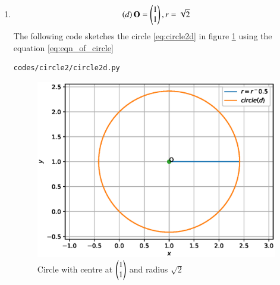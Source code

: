 \begin{enumerate}[label=\thesection.\arabic*.,ref=\thesection.\theenumi]
\item
\begin{align}
\left(d\right)\mathbf{O}=\begin{pmatrix}1\\1\end{pmatrix}, r=\sqrt{2}
\label{eq:circle2d}
\end{align}
The following code sketches the circle \ref{eq:circle2d} in figure \ref{fig:circle2d} using the equation \ref{eq:eqn_of_circle}
\begin{lstlisting}
codes/circle2/circle2d.py
\end{lstlisting}
\begin{figure}[!ht]
\centering
\includegraphics[width=\columnwidth]{./codes/circle2/pyfigs/circle2d.eps}
\caption{Circle with centre at $\begin{pmatrix}1\\1\end{pmatrix}$ and radius $\sqrt{2}$}
\label{fig:circle2d}
\end{figure}


\end{enumerate}

